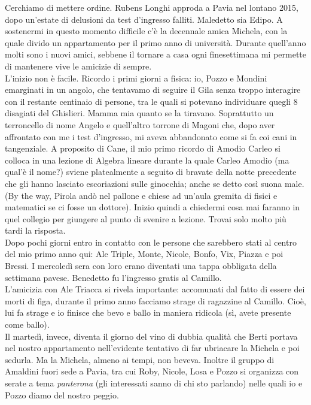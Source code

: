 \noindent Cerchiamo di mettere ordine. Rubens Longhi approda a Pavia nel lontano 2015, dopo un'estate di delusioni da test d'ingresso falliti. Maledetto sia Edipo. A sostenermi in questo momento difficile c'\`e la decennale amica Michela, con la quale divido un appartamento per il primo anno di universit\`a. Durante quell'anno molti sono i nuovi amici, sebbene il tornare a casa ogni finesettimana mi permette di mantenere vive le amicizie di sempre.\\
L'inizio non \`e facile. Ricordo i primi giorni a fisica: io, Pozzo e Mondini emarginati in un angolo, che tentavamo di seguire il Gila senza troppo interagire con il restante centinaio di persone, tra le quali si potevano individuare quegli 8 disagiati del Ghislieri. Mamma mia quanto se la tiravano. Soprattutto un terroncello di nome Angelo e quell'altro torrone di Magoni che, dopo aver affrontato con me i test d'ingresso, mi aveva abbandonato come si fa coi cani in tangenziale. A proposito di Cane, il mio primo ricordo di Amodio Carleo si colloca in una lezione di Algebra lineare durante la quale Carleo Amodio (ma qual'\`e il nome?) sviene platealmente a seguito di bravate della notte precedente che gli hanno lasciato escoriazioni sulle ginocchia; anche se detto cos\`i suona male. (By the way, Pirola and\`o nel pallone e chiese ad un'aula gremita di fisici e matematici se ci fosse un dottore). Inizio quindi a chiedermi cosa mai faranno in quel collegio per giungere al punto di svenire a lezione. Trovai solo molto pi\`u tardi la risposta.\\
Dopo pochi giorni entro in contatto con le persone che sarebbero stati al centro del mio primo anno qui: Ale Triple, Monte, Nicole, Bonfo, Vix, Piazza e poi Bressi. I mercoled\`i sera con loro erano diventati una tappa obbligata della settimana pavese. Benedetto fu l'ingresso gratis al Camillo.\\
L'amicizia con Ale Triacca si rivela importante: accomunati dal fatto di essere dei morti di figa, durante il primo anno facciamo strage di ragazzine al Camillo. Cio\`e, lui fa strage e io finisce che bevo e ballo in maniera ridicola (s\`i, avete presente come ballo).\\
Il marted\`i, invece, diventa il giorno del vino di dubbia qualit\`a che Berti portava nel nostro appartamento nell'evidente tentativo di far ubriacare la Michela e poi sedurla. Ma la Michela, almeno ai tempi, non beveva. Inoltre il gruppo di Amaldini fuori sede a Pavia, tra cui Roby, Nicole, Losa e Pozzo si organizza con serate a tema \emph{panterona} (gli interessati sanno di chi sto parlando) nelle quali io e Pozzo diamo del nostro peggio. \\
